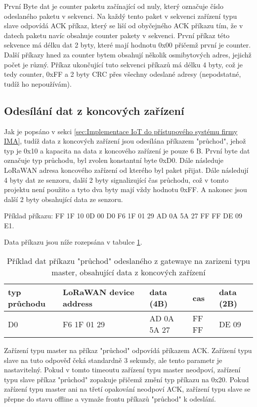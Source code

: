 První Byte dat je counter paketu začínající od nuly, který označuje číslo odeslaného paketu v sekvenci. Na každý tento paket v sekvenci zařízení typu slave odpovídá ACK příkaz, který se liší od obyčejného ACK příkazu tím, že v datech paketu navíc obsahuje counter pakety v sekvenci.
První příkaz této sekvence má délku dat 2 byty, které mají hodnotu 0x00 přičemž první je counter.
Další příkazy hned za counter bytem obsahují několik osmibytových adres, jejichž počet je různý.
Příkaz ukončující tuto sekvenci příkazů má délku 4 byty, což je tedy counter, 0xFF a 2 byty CRC přes všechny odeslané adresy (nepodstatné, tudíž ho nepoužívám).

\subsection{Odesílání dat z koncových zařízení}
\label{sec:Odesílání dat z koncových zařízení}
Jak je popsáno v sekci \ref{sec:Implementace IoT do přístupového systému firmy IMA}, tudíž data z koncových zařízení jsou odesílána příkazem "průchod", jehož typ je 0x10 a kapacita na data z koncového zařízení je pouze 6 B. 
První byte dat označuje typ průchodu, byl zvolen konstantní byte 0xD0. Dále následuje LoRaWAN adresa koncového zařízení od kterého byl paket přijat. Dále následují 4 byty dat ze senzoru, další 2 byty signalizující čas průchodu, což v tomto projektu není použito a tyto dva byty mají vždy hodnotu 0xFF. A nakonec jsou další 2 byty obsahující data ze senzoru.

Příklad příkazu: FF 1F 10 0D 00 D0 F6 1F 01 29 AD 0A 5A 27 FF FF DE 09 E1.

Data příkazu jsou níže rozepsána v tabulce \ref{table:prikladprikazpruchod}.

\begin{table}[!h]
    \centering
\begin{tabular}{ | p{1.5cm} | p{3cm} | p{2.5cm} | p{1.3cm} | p{1.3cm} |  }
 \hline
 typ průchodu & LoRaWAN device address & data (4B)     & cas   & data (2B) \\ \hline
 D0           & F6 1F 01 29            &  AD 0A 5A 27  & FF FF & DE 09     \\ 
 \hline
\end{tabular}
    \caption{Příklad dat příkazu "průchod" odeslaného z gatewaye na zarizeni typu master, obsahující data z koncových zařízení}
    \label{table:prikladprikazpruchod}
\end{table}

Zařízení typu master na příkaz "průchod" odpovídá příkazem ACK. Zařízení typu slave na tuto odpověď čeká standardně 3 sekundy, ale tento parametr je nastavitelný. Pokud v tomto timeoutu zařízení typu master neodpoví, zařízení typu slave příkaz "průchod" zopakuje přičemž změní typ příkazu na 0x20. Pokud zařízení typu master ani na třetí opakování neodpoví ACK, zařízení typu slave se přepne do stavu offline a vymaže frontu příkazů "průchod" k odeslání.

